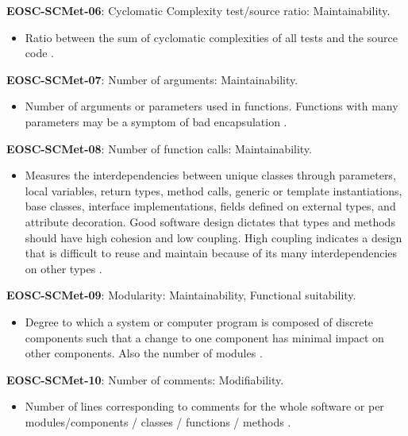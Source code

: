 \textbf{EOSC-SCMet-06}: Cyclomatic Complexity test/source ratio: Maintainability.

\begin{itemize}
    \item Ratio between the sum of cyclomatic complexities of all tests and the source code \cite{nagappan_early_2005}.
\end{itemize}

\textbf{EOSC-SCMet-07}: Number of arguments: Maintainability.

\begin{itemize}
    \item Number of arguments or parameters used in functions. Functions with many parameters may be a symptom of bad encapsulation \cite{baggen_standardized_2012,ogasawara_experiences_1996}.
\end{itemize}

\textbf{EOSC-SCMet-08}: Number of function calls: Maintainability.

\begin{itemize}
    \item Measures the interdependencies between unique classes through parameters, local variables, return types, method calls, generic or template instantiations, base classes, interface implementations, fields defined on external types, and attribute decoration. Good software design dictates that types and methods should have high cohesion and low coupling. High coupling indicates a design that is difficult to reuse and maintain because of its many interdependencies on other types \cite{montagud_systematic_2012,ogasawara_experiences_1996}.
\end{itemize}

\textbf{EOSC-SCMet-09}: Modularity: Maintainability, Functional suitability.

\begin{itemize}
    \item Degree to which a system or computer program is composed of discrete components such that a change to one component has minimal impact on other components. Also the number of modules \cite{iso_25010_2011_2017,montagud_systematic_2012,aberdour_achieving_2007,ogasawara_experiences_1996,shepherdson_cessda_2019}.
\end{itemize}

\textbf{EOSC-SCMet-10}: Number of comments: Modifiability.

\begin{itemize}
    \item Number of lines corresponding to comments for the whole software or per modules/components / classes / functions / methods \cite{srisopha_software_2018,montagud_systematic_2012,ogasawara_experiences_1996}.
\end{itemize}

